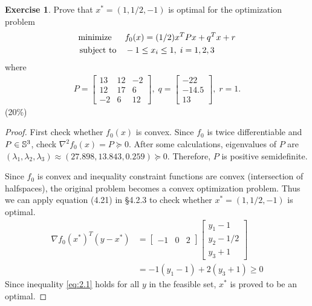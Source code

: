 \documentclass[12pt]{extarticle}
\theoremstyle{definition}
\newtheorem{exercise}{Exercise}
\begin{document}
\begin{exercise}
  Prove that $x^\ast=(1,1/2,-1)$ is optimal for the optimization problem
  \begin{align*}
    \text{minimize\;\;}\quad& f_0(x)=(1/2)x^TPx+q^Tx+r\\
    \text{subject to}  \quad& -1\le x_i \le 1,\;i=1,2,3
  \end{align*}
  where
  \begin{align*}
    P= \begin{bmatrix}13&12&-2\\12&17&6\\-2&6&12\end{bmatrix},\;
    q= \begin{bmatrix}-22\\-14.5\\13\end{bmatrix},\;
    r= 1.
  \end{align*}
  (20\%)
\end{exercise}
\begin{proof}
  First check whether $f_0(x)$ is convex. Since $f_0$ is twice differentiable and $P\in\mathbb{S}^3$, \ie check $\nabla^2f_0(x)=P\succeq 0$.
  After some calculations, eigenvalues of $P$ are $(\lambda_1,\lambda_2,\lambda_3)\approx(27.898,13.843,0.259)\succeq 0$.
  Therefore, $P$ is positive semidefinite.\par
  Since $f_0$ is convex and inequality constraint functions are convex (intersection of halfspaces), the original problem becomes a convex optimization problem.
  Thus we can apply equation (4.21) in \S 4.2.3 to check whether $x^\ast=(1,1/2,-1)$ is optimal.
  \begin{align}
    \nabla f_0(x^\ast)^T(y-x^\ast) &=
        \begin{bmatrix}-1&0&2\end{bmatrix}
        \begin{bmatrix}y_1-1\\y_2-1/2\\y_3+1\end{bmatrix}\nonumber\\
      &= -1(y_1-1)+2(y_3+1)\ge 0\label{eq:2.1}
  \end{align}
  Since inequality \eqref{eq:2.1} holds for all $y$ in the feasible set, $x^\ast$ is proved to be an optimal.
\end{proof}
\end{document}
